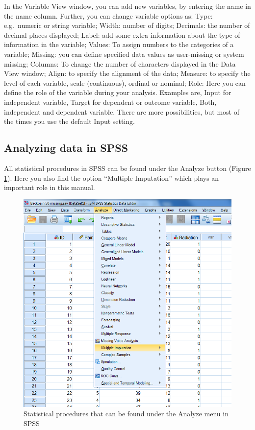 \documentclass[]{book}
\begin{document}
In the Variable View window, you can add new variables, by entering the
name in the name column. Further, you can change variable options as:
Type: e.g.~numeric or string variable; Width: number of digits;
Decimals: the number of decimal places displayed; Label: add some extra
information about the type of information in the variable; Values: To
assign numbers to the categories of a variable; Missing: you can define
specified data values as user-missing or system missing; Columns: To
change the number of characters displayed in the Data View window;
Align: to specify the alignment of the data; Measure: to specify the
level of each variable, scale (continuous), ordinal or nominal; Role:
Here you can define the role of the variable during your analysis.
Examples are, Input for independent variable, Target for dependent or
outcome variable, Both, independent and dependent variable. There are
more possibilities, but most of the times you use the default Input
setting.

\subsection{Analyzing data in SPSS}\label{analyzing-data-in-spss}

All statistical procedures in SPSS can be found under the Analyze button
(Figure \ref{fig:fig4}). Here you also find the option ``Multiple
Imputation'' which plays an important role in this manual.

\begin{figure}

{\centering \includegraphics[width=0.95\linewidth]{images/fig1.4} 

}

\caption{Statistical procedures that can be found under the Analyze menu in SPSS}\label{fig:fig4}
\end{figure}
\end{document}
